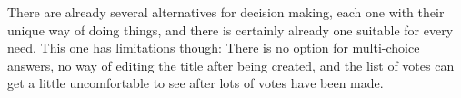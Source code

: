 There are already several alternatives for decision making, each one with their unique way of doing things, and there is certainly already one suitable for every need. This one has limitations though: There is no option for multi-choice answers, no way of editing the title after being created, and the list of votes can get a little uncomfortable to see after lots of votes have been made.
